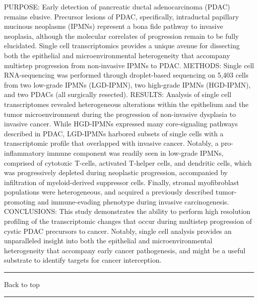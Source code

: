 \documentclass[]{article}
\begin{document}
PURPOSE: Early detection of pancreatic ductal adenocarcinoma (PDAC)
remains elusive. Precursor lesions of PDAC, specifically, intraductal
papillary mucinous neoplasms (IPMNs) represent a bona fide pathway to
invasive neoplasia, although the molecular correlates of progression
remain to be fully elucidated. Single cell transcriptomics provides a
unique avenue for dissecting both the epithelial and microenvironmental
heterogeneity that accompany multistep progression from non-invasive
IPMNs to PDAC. METHODS: Single cell RNA-sequencing was performed through
droplet-based sequencing on 5,403 cells from two low-grade IPMNs
(LGD-IPMN), two high-grade IPMNs (HGD-IPMN), and two PDACs (all
surgically resected). RESULTS: Analysis of single cell transcriptomes
revealed heterogeneous alterations within the epithelium and the tumor
microenvironment during the progression of non-invasive dysplasia to
invasive cancer. While HGD-IPMNs expressed many core-signaling pathways
described in PDAC, LGD-IPMNs harbored subsets of single cells with a
transcriptomic profile that overlapped with invasive cancer. Notably, a
pro-inflammatory immune component was readily seen in low-grade IPMNs,
comprised of cytotoxic T-cells, activated T-helper cells, and dendritic
cells, which was progressively depleted during neoplastic progression,
accompanied by infiltration of myeloid-derived suppressor cells.
Finally, stromal myofibroblast populations were heterogeneous, and
acquired a previously described tumor-promoting and immune-evading
phenotype during invasive carcinogenesis. CONCLUSIONS: This study
demonstrates the ability to perform high resolution profiling of the
transcriptomic changes that occur during multistep progression of cystic
PDAC precursors to cancer. Notably, single cell analysis provides an
unparalleled insight into both the epithelial and microenvironmental
heterogeneity that accompany early cancer pathogenesis, and might be a
useful substrate to identify targets for cancer interception.

{}

{}

\begin{center}\rule{0.5\linewidth}{\linethickness}\end{center}

Back to top

\begin{center}\rule{0.5\linewidth}{\linethickness}\end{center}

\pagebreak
\end{document}
